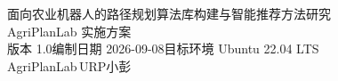 \documentclass[UTF8,fontset=windows,zihao=-4,scheme=chinese]{ctexart}
\begin{document}
\begin{center}
  {\heiti 面向农业机器人的路径规划算法库构建与智能推荐方法研究}\\[0.6em]
  {\heiti AgriPlanLab 实施方案}\\[1.4em]
  { 版本 1.0\quad 编制日期 2026-09-08\quad 目标环境 Ubuntu 22.04 LTS}\\[1.6em]
  { AgriPlanLab\,URP\quad 小彭}
\end{center}
\vspace{1em}
\thispagestyle{plain}



\vspace{0.5em}
{\small\tableofcontents}
\clearpage


\end{document}
